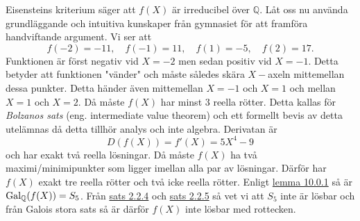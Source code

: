 \documentclass{article}
\newcommand{\gal}[0]{\textnormal{Gal}}
\theoremstyle{definition}
\begin{document}
Eisensteins kriterium säger att $f(X)$ är irreducibel över $\mathbb{Q}$. Låt oss nu använda grundläggande och intuitiva kunskaper 
från gymnasiet för att framföra handviftande argument. Vi ser att 
\[f(-2) = -11, \quad f(-1) = 11, \quad f(1) = -5, \quad f(2) = 17.\]
Funktionen är först negativ vid $X = -2$ men sedan positiv vid $X = -1$. Detta betyder att funktionen "vänder" och måste således 
skära $X-$axeln mittemellan dessa punkter. Detta händer även mittemellan $X = -1$ och $X = 1$ och mellan $X = 1$ och $X = 2$. 
Då måste $f(X)$ har minst 3 reella rötter. Detta kallas för \textit{Bolzanos sats} (eng. intermediate value theorem)
och ett formellt bevis av detta utelämnas då detta tillhör analys och inte algebra. Derivatan är 
\[D(f(X)) = f'(X) = 5X^4 - 9\]
och har exakt två reella lösningar. Då måste $f(X)$ ha två maximi/minimipunkter som ligger imellan alla par av lösningar. 
Därför har $f(X)$ exakt tre reella rötter och två icke reella rötter. Enligt \hyperlink{lemma11.0.1}{lemma 10.0.1} så är $\gal_{\mathbb{Q}}(f(X)) = S_5$.
Från \hyperlink{sats3.2.4}{sats 2.2.4} och \hyperlink{sats3.2.5}{sats 2.2.5} så vet vi att $S_5$ inte är lösbar och från Galois stora sats så är 
därför $f(X)$ inte lösbar med rottecken. 

\end{document}
